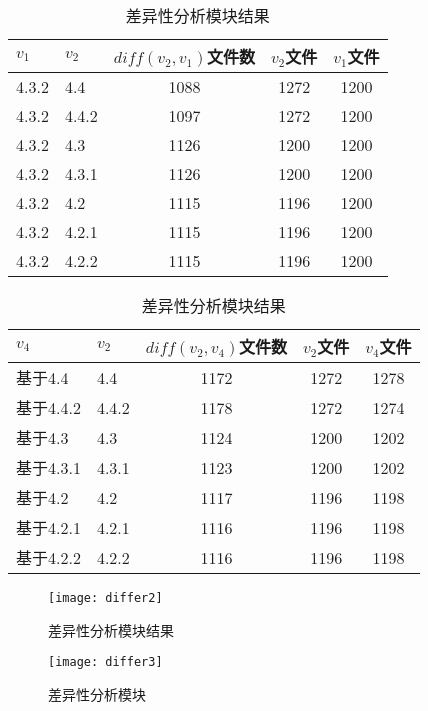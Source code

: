 \begin{table}[H]
	\caption{差异性分析模块结果}
	\label{data_differ_2}
	\centering
	\begin{tabular}{llccc}
		\toprule[1.5pt]
		{\heiti $v_1$} & {\heiti $v_2$} & {\heiti $diff(v_2,v_1)$文件数} & {\heiti $v_2$文件} & {\heiti $v_1$文件} \\\midrule[1pt]
		4.3.2 & 4.4	& 1088 & 1272 & 1200\\		
		4.3.2 & 4.4.2 & 1097 & 1272	& 1200	\\
		4.3.2 & 4.3 	 & 1126 & 1200	& 1200		\\
		4.3.2 & 4.3.1  & 1126 & 1200 & 1200			\\
		4.3.2 & 4.2 	& 1115 & 1196 & 1200		\\
		4.3.2 & 4.2.1 & 1115 & 1196 & 1200		\\
		4.3.2 & 4.2.2  & 1115 & 1196 & 1200		\\
		\bottomrule[1.5pt]
	\end{tabular}
\end{table}

\begin{table}[H]
	\caption{差异性分析模块结果}
	\label{data_differ_3}
	\centering
	\begin{tabular}{llccc}
		\toprule[1.5pt]
		{\heiti $v_4$} & {\heiti $v_2$} & {\heiti $diff(v_2,v_4)$文件数} & {\heiti $v_2$文件} & {\heiti $v_4$文件} \\\midrule[1pt]
		基于4.4 & 4.4	& 1172 & 1272 &	1278\\		
		基于4.4.2 & 4.4.2 & 1178 & 1272 & 1274		\\
		基于4.3 & 4.3 	 & 1124 & 1200	& 1202		\\
		基于4.3.1 & 4.3.1  & 1123 & 1200	& 1202		\\
		基于4.2 & 4.2 	& 1117 & 1196 & 1198		\\
		基于4.2.1 & 4.2.1 & 1116 & 1196	& 1198		\\
		基于4.2.2 & 4.2.2  & 1116 & 1196 & 1198		\\
		\bottomrule[1.5pt]
	\end{tabular}
\end{table}

\begin{figure}[H]
	\centering
	\texttt{[image: differ2]}
	\caption {差异性分析模块结果}
	\label {differ2}	
\end{figure}



\begin{figure}[H]
	\centering
	\texttt{[image: differ3]}
	\caption {差异性分析模块}
	\label {differ3}	
\end{figure}




